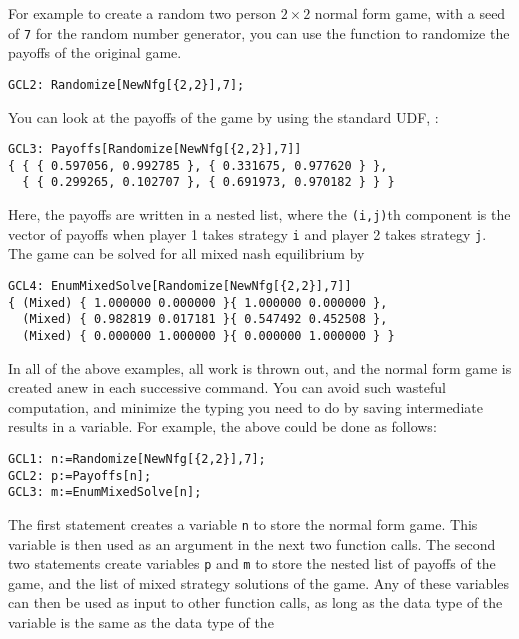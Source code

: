 For example to create a random two person $2\times 2$ normal form
game, with a seed of \verb+7+ for the random number generator, you can
use the function  to randomize the payoffs of the
original game.

\begin{verbatim}
GCL2: Randomize[NewNfg[{2,2}],7];
\end{verbatim}  

\noindent
You can look at the payoffs of the game by using the standard UDF,
:

\begin{verbatim}
GCL3: Payoffs[Randomize[NewNfg[{2,2}],7]]
{ { { 0.597056, 0.992785 }, { 0.331675, 0.977620 } },
  { { 0.299265, 0.102707 }, { 0.691973, 0.970182 } } }
\end{verbatim}  

\noindent
Here, the payoffs are written in a nested list, where the
\verb+(i,j)+th component is the vector of payoffs when player 1 takes
strategy \verb+i+ and player 2 takes strategy \verb+j+.  The game can
be solved for all mixed nash equilibrium by

\begin{verbatim}
GCL4: EnumMixedSolve[Randomize[NewNfg[{2,2}],7]]
{ (Mixed) { 1.000000 0.000000 }{ 1.000000 0.000000 },
  (Mixed) { 0.982819 0.017181 }{ 0.547492 0.452508 },
  (Mixed) { 0.000000 1.000000 }{ 0.000000 1.000000 } }
\end{verbatim}

In all of the above examples, all work is thrown out, and the normal
form game is created anew in each successive command.  You can avoid
such wasteful computation, and minimize the typing you need to do by
saving intermediate results in a variable.  For example, the above
could be done as follows:

\begin{verbatim}
GCL1: n:=Randomize[NewNfg[{2,2}],7];
GCL2: p:=Payoffs[n];
GCL3: m:=EnumMixedSolve[n];
\end{verbatim}

The first statement creates a variable \verb+n+ to store the normal
form game.  This variable is then used as an argument in the next two
function calls.  The second two statements create variables \verb+p+
and \verb+m+ to store the nested list of payoffs of the game, and the
list of mixed strategy solutions of the game.  Any of these variables
can then be used as input to other function calls, as long as the data
type of the variable is the same as the data type of the 

